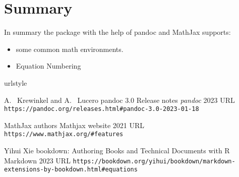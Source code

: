 \section{Summary}

In summary the  package with the help of pandoc and MathJax supports:
\begin{itemize}
\item some common math environments.
\item Equation Numbering
\end{itemize}


\begin{thebibliography}{2}
    \providecommand{\natexlab}[1]{#1}
    \providecommand{\url}[1]{\texttt{#1}}
    \expandafter\ifx\csname urlstyle\endcsname\relax
      \providecommand{\doi}[1]{doi: #1}\else
      \providecommand{\doi}{doi: \begingroup \urlstyle{rm}\Url}\fi

A.~ Krewinkel and A.~ Lucero
\newblock pandoc 3.0 Release notes
\newblock \emph{pandoc}  2023
\newblock URL \url{https://pandoc.org/releases.html#pandoc-3.0-2023-01-18}

MathJax authors
\newblock Mathjax website
\newblock  {} 2021
\newblock URL \url{https://www.mathjax.org/#features}

Yihui Xie
\newblock bookdown: Authoring Books and Technical Documents with R Markdown
\newblock {} 2023
\newblock URL \url{https://bookdown.org/yihui/bookdown/markdown-extensions-by-bookdown.html#equations}

\end{thebibliography}


\address{%
Abhishek Ulayil\\
Student, Institute of Actuaries of India\\%
Mumbai, India\\
ORCiD: 0009-0000-6935-8690\\
}
